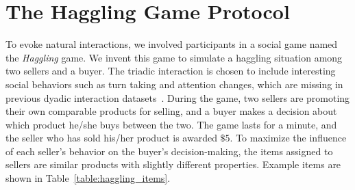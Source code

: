 \section{The Haggling Game Protocol}
To evoke natural interactions, we involved participants in a social game named the \emph{Haggling} game. We invent this game to simulate a haggling situation among two sellers and a buyer. The triadic interaction is chosen to include interesting social behaviors such as turn taking and attention changes, which are missing in previous dyadic interaction datasets~\cite{rehg2013decoding}. During the game, two sellers are promoting their own comparable products for selling, and a buyer makes a decision about which product he/she buys between the two. The game lasts for a minute, and the seller who has sold his/her product is awarded $\$5$. To maximize the influence of each seller's behavior on the buyer's decision-making, the items assigned to sellers are similar products with slightly different properties. Example items are shown in Table~\ref{table:haggling_items}. 


